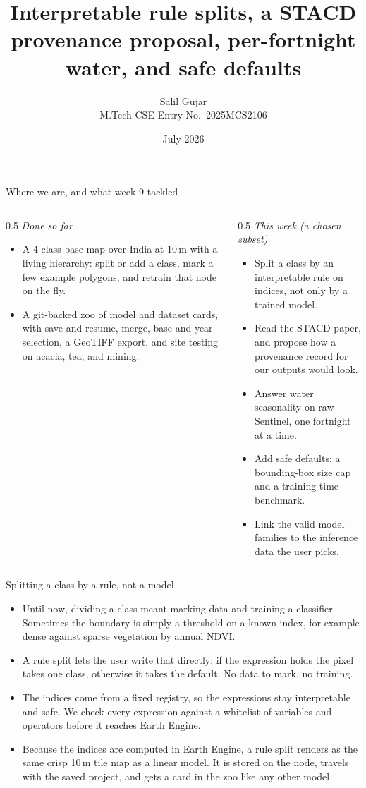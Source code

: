 \documentclass[aspectratio=169]{beamer}
\title[Rules, provenance, and raw-Sentinel water]{Interpretable rule splits, a STACD provenance proposal, per-fortnight water, and safe defaults}
\author[Salil Gujar]{Salil Gujar \\ \footnotesize M.Tech CSE \quad Entry No.\ 2025MCS2106}
\date{July 2026}
\begin{document}
\frame{\titlepage}

\begin{frame}{Where we are, and what week 9 tackled}
\begin{columns}[T]
\begin{column}{0.5\textwidth}
\emph{Done so far}
\begin{itemize}\small
  \item A 4-class base map over India at 10\,m with a living hierarchy: split or add a class, mark a
  few example polygons, and retrain that node on the fly.
  \item A git-backed zoo of model and dataset cards, with save and resume, merge, base and year
  selection, a GeoTIFF export, and site testing on acacia, tea, and mining.
\end{itemize}
\end{column}
\begin{column}{0.5\textwidth}
\emph{This week (a chosen subset)}
\begin{itemize}\small
  \item Split a class by an interpretable rule on indices, not only by a trained model.
  \item Read the STACD paper, and propose how a provenance record for our outputs would look.
  \item Answer water seasonality on raw Sentinel, one fortnight at a time.
  \item Add safe defaults: a bounding-box size cap and a training-time benchmark.
  \item Link the valid model families to the inference data the user picks.
\end{itemize}
\end{column}
\end{columns}
\end{frame}

\begin{frame}{Splitting a class by a rule, not a model}
\begin{itemize}
  \item Until now, dividing a class meant marking data and training a classifier. Sometimes the
  boundary is simply a threshold on a known index, for example dense against sparse vegetation by
  annual NDVI.
  \item A rule split lets the user write that directly: if the expression holds the pixel takes one
  class, otherwise it takes the default. No data to mark, no training.
  \item The indices come from a fixed registry, so the expressions stay interpretable and safe. We
  check every expression against a whitelist of variables and operators before it reaches Earth
  Engine.
  \item Because the indices are computed in Earth Engine, a rule split renders as the same crisp
  10\,m tile map as a linear model. It is stored on the node, travels with the saved project, and
  gets a card in the zoo like any other model.
\end{itemize}
\end{frame}
\end{document}
